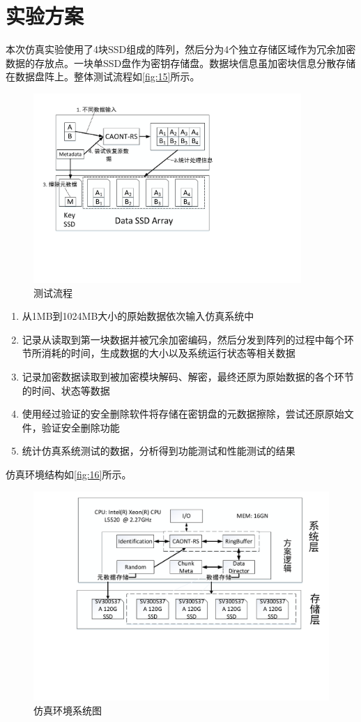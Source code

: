 \section{实验方案}
本次仿真实验使用了4块SSD组成的阵列，然后分为4个独立存储区域作为冗余加密数据的存放点。一块单SSD盘作为密钥存储盘。数据块信息虽加密块信息分散存储在数据盘阵上。整体测试流程如\autoref{fig:15}所示。
\begin{figure}[H]
	\centering
	\includegraphics[width=4in]{Pics/test-pr.pdf}
	\caption{测试流程}
	\label{fig:15}
\end{figure}
\begin{enumerate}
	\item 从1MB到1024MB大小的原始数据依次输入仿真系统中
	\item 记录从读取到第一块数据并被冗余加密编码，然后分发到阵列的过程中每个环节所消耗的时间，生成数据的大小以及系统运行状态等相关数据
	\item 记录加密数据读取到被加密模块解码、解密，最终还原为原始数据的各个环节的时间、状态等数据
	\item 使用经过验证的安全删除软件将存储在密钥盘的元数据擦除，尝试还原原始文件，验证安全删除功能
	\item 统计仿真系统测试的数据，分析得到功能测试和性能测试的结果
\end{enumerate}
仿真环境结构如\autoref{fig:16}所示。
\begin{figure}[htb]
	\centering
	\includegraphics[width=1\textwidth]{Pics/test-env.pdf}
	\caption{仿真环境系统图}
	\label{fig:16}
\end{figure}
